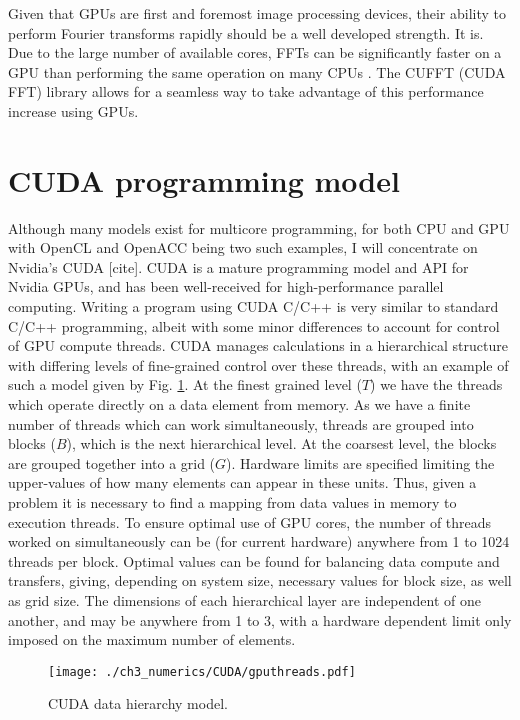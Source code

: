 Given that GPUs are first and foremost image processing devices, their ability to perform Fourier transforms rapidly should be a well developed strength. It is. Due to the large number of available cores, FFTs can be significantly faster on a GPU than performing the same operation on many CPUs \cite{AO:Morgan_ORiordan_pra_2013}. The CUFFT (CUDA FFT) library allows for a seamless way to take advantage of this performance increase using GPUs.

\section{CUDA programming model}
Although many models exist for multicore programming, for both CPU and GPU with OpenCL and OpenACC being two such examples, I will concentrate on Nvidia's CUDA [cite]. CUDA is a mature programming model and API for Nvidia GPUs, and has been well-received for high-performance parallel computing. Writing a program using CUDA C/C++ is very similar to standard C/C++ programming, albeit with some minor differences to account for control of GPU compute threads. CUDA manages calculations in a hierarchical structure with differing levels of fine-grained control over these threads, with an example of such a model given by Fig. \ref{fig:gpu_threads}. At the finest grained level ($T$) we have the threads which operate directly on a data element from memory. As we have a finite number of threads which can work simultaneously, threads are grouped into blocks ($B$), which is the next hierarchical level. At the coarsest level, the blocks are grouped together into a grid ($G$). Hardware limits are specified limiting the upper-values of how many elements can appear in these units. Thus, given a problem it is necessary to find a mapping from data values in memory to execution threads. To ensure optimal use of GPU cores, the number of threads worked on simultaneously can be (for current hardware) anywhere from 1 to 1024 threads per block. Optimal values can be found for balancing data compute and transfers, giving, depending on system size, necessary values for block size, as well as grid size. The dimensions of each hierarchical layer are independent of one another, and may be anywhere from 1 to 3, with a hardware dependent limit only imposed on the maximum number of elements.

\begin{figure}[tb]
    \centering
    \texttt{[image: ./ch3\_numerics/CUDA/gputhreads.pdf]}
    \caption{CUDA data hierarchy model.}
    \label{fig:gpu_threads}
\end{figure}


